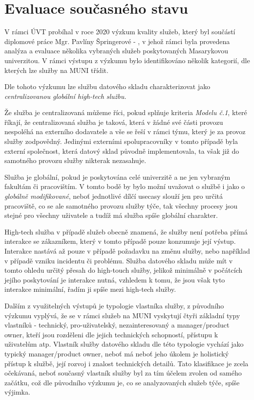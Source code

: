 \documentclass[
  digital,     %
  twoside,     %
  lof,         %
  lot,         %
]{fithesis4}
\begin{document}
\section{Evaluace současného stavu}
V rámci ÚVT probíhal v roce 2020 výzkum kvality služeb, který byl součástí diplomové práce Mgr. Pavlíny Špringerové - , v jehož rámci byla provedena analýza a evaluace několika vybraných služeb poskytovaných Masarykovou univerzitou. V rámci výstupu z výzkumu bylo identifikováno několik kategorií, dle kterých lze služby na MUNI třídit. 

Dle tohoto výzkumu lze službu datového skladu charakterizovat jako \emph{centralizovanou globální high-tech službu.} 

Že služba je centralizovaná můžeme říci, pokud splňuje kriteria \emph{Modelu č.1}, které říkají, že centralizovaná služba je taková, která v žádné své části provozu nespoléhá na externího dodavatele a vše se řeší v rámci týmu, který je za provoz služby zodpovědný.\parencite[s. 103]{Springerova2020} Jedinými externími spolupracovníky v tomto případě byla externí společnost, která datový sklad původně implementovala, ta však již do samotného provozu služby nikterak nezasahuje. 

Služba je globální, pokud je poskytována celé univerzitě a ne jen vybraným fakultám či pracovištím.\parencite[s. 47]{Springerova2020} V tomto bodě by bylo možní uvažovat o službě i jako o \emph{globálně modifikované}, neboť jednotlivé dílčí usecasy slouží jen pro určitá pracoviště, co se ale samotného provozu služby týče, tak všechny procesy jsou stejné pro všechny uživatele a tudíž má služba spíše globální charakter.

High-tech služba v případě služeb obecně znamená, že služby není potřeba přímá interakce se zákazníkem, který v tomto případě pouze konzumuje její výstup. Interakce nastává až pouze v případě požadavku na změnu služby, nebo například v případě vzniku incidentu či problému.\parencite[s. 47]{Springerova2020} Služba datového skladu může mít v tomto ohledu určitý přesah do high-touch služby, jelikož minimálně v počátcích jejího poskytování je interakce nutná, vzhledem k tomu, že jsou však tyto interakce minimální, řadím ji spíše mezi high-tech služby.

Dalším z využitelných výstupů je typologie vlastníka služby, z původního výzkumu vyplývá, že se v rámci služeb na MUNI vyskytují čtyři základní typy vlastníků - technický, pro-uživatelský, nezainteresovaný a manager/product owner, kteří jsou rozděleni dle jejich technických schopností, přístupu k uživatelům atp.\parencite[s. 78]{Springerova2020} Vlastník služby datového skladu dle této typologie vychází jako typický manager/product owner, neboť má neboť jeho úkolem je holistický přístup k službě, její rozvoj i znalost technických detailů.  Tato klasifikace je zcela očekávaná, neboť současný vlastník služby byl za tím účelem zvolen od samého začátku, což dle původního výzkumu je, co se analyzovaných služeb týče, spíše výjimka. 
\end{document}
